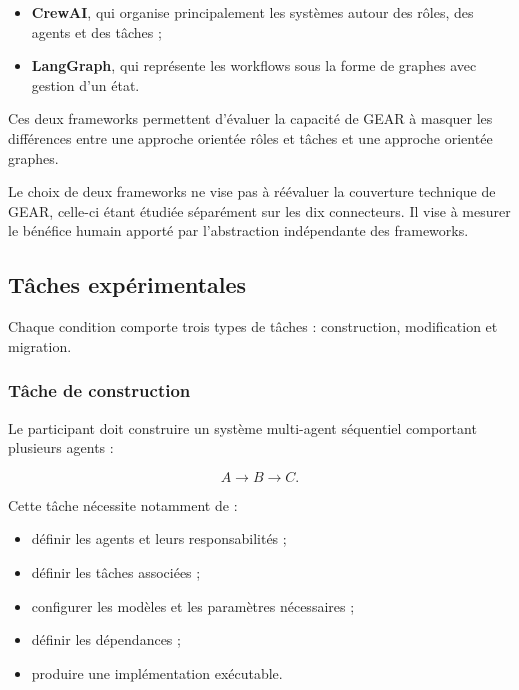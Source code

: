 \begin{itemize}
    \item \textbf{CrewAI}, qui organise principalement les systèmes
    autour des rôles, des agents et des tâches ;

    \item \textbf{LangGraph}, qui représente les workflows sous la
    forme de graphes avec gestion d'un état.
\end{itemize}

Ces deux frameworks permettent d'évaluer la capacité de GEAR à masquer
les différences entre une approche orientée rôles et tâches et une
approche orientée graphes.

Le choix de deux frameworks ne vise pas à réévaluer la couverture
technique de GEAR, celle-ci étant étudiée séparément sur les dix
connecteurs. Il vise à mesurer le bénéfice humain apporté par
l'abstraction indépendante des frameworks.


\subsection{Tâches expérimentales}
\label{subsec:taches-experimentales}

Chaque condition comporte trois types de tâches : construction,
modification et migration.


\subsubsection{Tâche de construction}

Le participant doit construire un système multi-agent séquentiel
comportant plusieurs agents :

\begin{equation}
A \rightarrow B \rightarrow C.
\end{equation}

Cette tâche nécessite notamment de :

\begin{itemize}
    \item définir les agents et leurs responsabilités ;
    \item définir les tâches associées ;
    \item configurer les modèles et les paramètres nécessaires ;
    \item définir les dépendances ;
    \item produire une implémentation exécutable.
\end{itemize}

